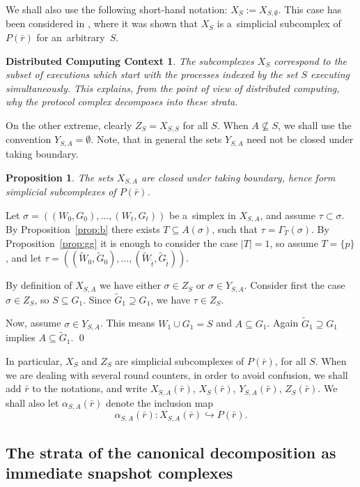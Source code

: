 \documentclass{amsart}[10pt]
\newtheorem{prop}[theorem]{Proposition}
\newtheorem{dcc}[theorem]{Distributed Computing Context}
\newcommand{\pr}{\nin{\bf Proof.} }
\newcommand{\es}{\emptyset}
\newcommand{\tr}{{\bar r}}
\newcommand{\wti}{\widetilde}
\numberwithin{equation}{section}
\numberwithin{figure}{section}
\numberwithin{table}{section}
\begin{document}
We shall also use the following short-hand notation:
$X_S:=X_{S,\emptyset}$. This case has been considered in \cite{k1},
where it was shown that $X_S$ is a~simplicial subcomplex of $P(\tr)$
for an~arbitrary~$S$.

\begin{dcc}
The subcomplexes $X_S$ correspond to the subset of executions which
start with the processes indexed by the set $S$ executing
simultaneously.  This explains, from the point of view of distributed
computing, why the protocol complex decomposes into these strata.
\end{dcc}

On the other extreme, clearly $Z_S=X_{S,S}$ for all $S$.  When
$A\not\subseteq S$, we shall use the convention $Y_{S,A}=\es$.  Note,
that in general the sets $Y_{S,A}$ need not be closed under taking
boundary.

\begin{prop}
The sets $X_{S,A}$ are closed under taking boundary, hence form
simplicial subcomplexes of $P(\tr)$.
\end{prop}
\pr Let $\sigma=((W_0,G_0),\dots,(W_t,G_t))$ be a~simplex in
$X_{S,A}$, and assume $\tau\subset\sigma$. By Proposition~\ref{prop:b}
there exists $T\subseteq A(\sigma)$, such that
$\tau=\Gamma_T(\sigma)$. By Proposition~\ref{prop:gg} it is enough to
consider the case $|T|=1$, so assume $T=\{p\}$, and let $\tau=((\wti
W_0,\wti G_0),\dots,(\wti W_{\tilde t},\wti G_{\tilde t}))$.

By definition of $X_{S,A}$ we have either $\sigma\in Z_S$ or
$\sigma\in Y_{S,A}$.  Consider first the case $\sigma\in Z_S$, so
$S\subseteq G_1$. Since $\wti G_1\supseteq G_1$, we have $\tau\in
Z_S$.

Now, assume $\sigma\in Y_{S,A}$. This means $W_1\cup G_1=S$ and
$A\subseteq G_1$. Again $\wti G_1\supseteq G_1$ implies
$A\subseteq\wti G_1$.  \qed

\vspace{5pt}

\noindent
In particular, $X_S$ and $Z_S$ are simplicial subcomplexes of
$P(\tr)$, for all $S$. When we are dealing with several round
counters, in order to avoid confusion, we shall add $\tr$ to the
notations, and write $X_{S,A}(\tr)$, $X_S(\tr)$, $Y_{S,A}(\tr)$,
$Z_S(\tr)$. We shall also let $\alpha_{S,A}(\tr)$ denote the inclusion
map 
\[\alpha_{S,A}(\tr):X_{S,A}(\tr)\hookrightarrow P(\tr).\]



\subsection{The strata of the canonical decomposition as immediate snapshot complexes}
$\,$
\end{document}
